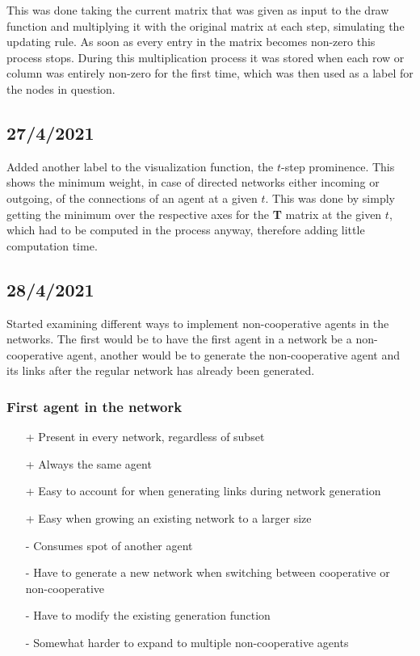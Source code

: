 \documentclass{article}
\begin{document}
This was done taking the current matrix that was given as input to the draw function and multiplying it with the original matrix at each step, simulating the updating rule. As soon as every entry in the matrix becomes non-zero this process stops. During this multiplication process it was stored when each row or column was entirely non-zero for the first time, which was then used as a label for the nodes in question.

\subsection{27/4/2021}

Added another label to the visualization function, the $t$-step prominence. This shows the minimum weight, in case of directed networks either incoming or outgoing, of the connections of an agent at a given $t$. This was done by simply getting the minimum over the respective axes for the \textbf{T} matrix at the given $t$, which had to be computed in the process anyway, therefore adding little computation time.

\subsection{28/4/2021}
Started examining different ways to implement non-cooperative agents in the networks. The first would be to have the first agent in a network be a non-cooperative agent, another would be to generate the non-cooperative agent and its links after the regular network has already been generated.

\subsubsection*{First agent in the network}
\begin{itemize}
    \item[+] Present in every network, regardless of subset
    \item[+] Always the same agent
    \item[+] Easy to account for when generating links during network generation
    \item[+] Easy when growing an existing network to a larger size
    \item[-] Consumes spot of another agent
    \item[-] Have to generate a new network when switching between cooperative or non-cooperative
    \item[-] Have to modify the existing generation function
    \item[-] Somewhat harder to expand to multiple non-cooperative agents
\end{itemize}
\end{document}
